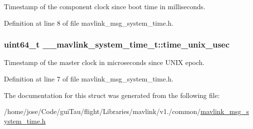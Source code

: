 Timestamp of the component clock since boot time in milliseconds. 



Definition at line 8 of file mavlink\-\_\-msg\-\_\-system\-\_\-time.\-h.

\hypertarget{struct____mavlink__system__time__t_ae546feebc5c1920448812ff0f2432366}{
\subsubsection[{time\-\_\-unix\-\_\-usec}]{\setlength{\rightskip}{0pt plus 5cm}uint64\-\_\-t \-\_\-\-\_\-mavlink\-\_\-system\-\_\-time\-\_\-t\-::time\-\_\-unix\-\_\-usec}}\label{struct____mavlink__system__time__t_ae546feebc5c1920448812ff0f2432366}


Timestamp of the master clock in microseconds since U\-N\-I\-X epoch. 



Definition at line 7 of file mavlink\-\_\-msg\-\_\-system\-\_\-time.\-h.



The documentation for this struct was generated from the following file\-:\begin{DoxyCompactItemize}
\item 
/home/jose/\-Code/gui\-Tau/flight/\-Libraries/mavlink/v1./common/\hyperlink{mavlink__msg__system__time_8h}{mavlink\-\_\-msg\-\_\-system\-\_\-time.\-h}\end{DoxyCompactItemize}
